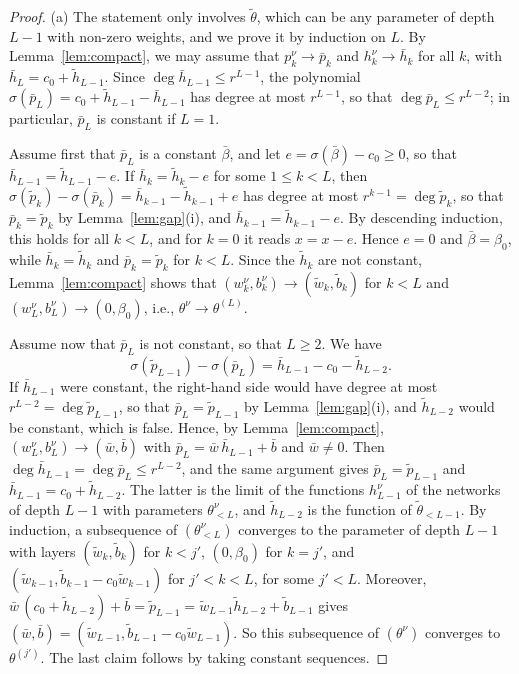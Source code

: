 \documentclass[11pt]{article}
\theoremstyle{definition}
\theoremstyle{remark}
\begin{document}
\begin{proof}
(a) The statement only involves $\tilde\theta$, which can be any parameter of depth $L-1$ with non-zero weights, and we prove it by induction on $L$. By Lemma~\ref{lem:compact}, we may assume that $p^\nu_k\to\bar p_k$ and $h^\nu_k\to\bar h_k$ for all $k$, with $\bar h_L=c_0+\tilde h_{L-1}$. Since $\deg\bar h_{L-1}\le r^{L-1}$, the polynomial $\sigma(\bar p_L)=c_0+\tilde h_{L-1}-\bar h_{L-1}$ has degree at most $r^{L-1}$, so that $\deg\bar p_L\le r^{L-2}$; in particular, $\bar p_L$ is constant if $L=1$.

Assume first that $\bar p_L$ is a constant $\bar\beta$, and let $e=\sigma(\bar\beta)-c_0\ge0$, so that $\bar h_{L-1}=\tilde h_{L-1}-e$. If $\bar h_k=\tilde h_k-e$ for some $1\le k<L$, then $\sigma(\tilde p_k)-\sigma(\bar p_k)=\bar h_{k-1}-\tilde h_{k-1}+e$ has degree at most $r^{k-1}=\deg\tilde p_k$, so that $\bar p_k=\tilde p_k$ by Lemma~\ref{lem:gap}(i), and $\bar h_{k-1}=\tilde h_{k-1}-e$. By descending induction, this holds for all $k<L$, and for $k=0$ it reads $x=x-e$. Hence $e=0$ and $\bar\beta=\beta_0$, while $\bar h_k=\tilde h_k$ and $\bar p_k=\tilde p_k$ for $k<L$. Since the $\tilde h_k$ are not constant, Lemma~\ref{lem:compact} shows that $(w^\nu_k,b^\nu_k)\to(\tilde w_k,\tilde b_k)$ for $k<L$ and $(w^\nu_L,b^\nu_L)\to(0,\beta_0)$, i.e., $\theta^\nu\to\theta^{(L)}$.

Assume now that $\bar p_L$ is not constant, so that $L\ge2$. We have
\[
\sigma(\tilde p_{L-1})-\sigma(\bar p_L)=\bar h_{L-1}-c_0-\tilde h_{L-2}.
\]
If $\bar h_{L-1}$ were constant, the right-hand side would have degree at most $r^{L-2}=\deg\tilde p_{L-1}$, so that $\bar p_L=\tilde p_{L-1}$ by Lemma~\ref{lem:gap}(i), and $\tilde h_{L-2}$ would be constant, which is false. Hence, by Lemma~\ref{lem:compact}, $(w^\nu_L,b^\nu_L)\to(\bar w,\bar b)$ with $\bar p_L=\bar w\,\bar h_{L-1}+\bar b$ and $\bar w\ne0$. Then $\deg\bar h_{L-1}=\deg\bar p_L\le r^{L-2}$, and the same argument gives $\bar p_L=\tilde p_{L-1}$ and $\bar h_{L-1}=c_0+\tilde h_{L-2}$. The latter is the limit of the functions $h^\nu_{L-1}$ of the networks of depth $L-1$ with parameters $\theta^\nu_{<L}$, and $\tilde h_{L-2}$ is the function of $\tilde\theta_{<L-1}$. By induction, a subsequence of $(\theta^\nu_{<L})$ converges to the parameter of depth $L-1$ with layers $(\tilde w_k,\tilde b_k)$ for $k<j'$, $(0,\beta_0)$ for $k=j'$, and $(\tilde w_{k-1},\tilde b_{k-1}-c_0\tilde w_{k-1})$ for $j'<k<L$, for some $j'<L$. Moreover, $\bar w\,(c_0+\tilde h_{L-2})+\bar b=\tilde p_{L-1}=\tilde w_{L-1}\tilde h_{L-2}+\tilde b_{L-1}$ gives $(\bar w,\bar b)=(\tilde w_{L-1},\tilde b_{L-1}-c_0\tilde w_{L-1})$. So this subsequence of $(\theta^\nu)$ converges to $\theta^{(j')}$. The last claim follows by taking constant sequences.


\end{proof}
\end{document}
